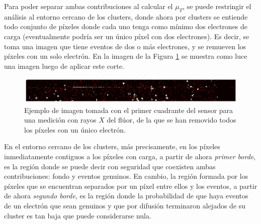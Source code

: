 Para poder separar ambas contribuciones al calcular el $\mu_{T}$, se puede restringir el análisis al entorno cercano de los clusters, donde ahora por clusters se entiende todo conjunto de píxeles donde cada uno tenga como mínimo dos electrones de carga (eventualmente podría ser un único píxel con dos electrones). Es decir, se toma una imagen que tiene eventos de dos o más electrones, y se remueven los píxeles con un solo electrón. 
En la imagen de la Figura \ref{fig:ImagenFits2omasElectrones} se muestra como luce una imagen luego de aplicar este corte.
\begin{figure}[h]
    \centering
    \includegraphics[scale=0.4]{Figs/imagen_fits_2_o_mas.pdf}
    \caption{Ejemplo de imagen tomada con el primer cuadrante del sensor para una medición con rayos $X$ del flúor, de la que se han removido todos los píxeles con un único electrón.}
    \label{fig:ImagenFits2omasElectrones}
\end{figure}
En el entorno cercano de los clusters, más precisamente, en los píxeles inmediatamente contiguos a los píxeles con carga, a partir de ahora  \textit{primer borde}, es la región donde se puede decir con seguridad que coexisten ambas contribuciones: fondo y eventos genuinos. En cambio, la región formada por los píxeles que se encuentran separados por un píxel entre ellos y los eventos, a partir de ahora \textit{segundo borde}, es la región donde la probabilidad de que haya eventos de un electrón que sean genuinos y que por difusión terminaron alejados de su cluster es tan baja que puede considerarse nula. 
